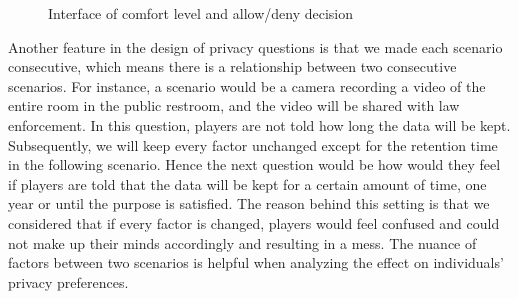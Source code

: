 \documentclass[msc,deptreport,ai]{infthesis}      %
\begin{document}
\begin{figure}[htbp]
\center
{}\hspace{-1pt}%
\hspace{-1pt}%
\caption{Interface of comfort level and allow/deny decision}
\label{fig:select}
\end{figure}

Another feature in the design of privacy questions is that we made each scenario consecutive, which means there is a relationship between two consecutive scenarios. For instance, a scenario would be a camera recording a video of the entire room in the public restroom, and the video will be shared with law enforcement. In this question, players are not told how long the data will be kept. Subsequently, we will keep every factor unchanged except for the retention time in the following scenario. Hence the next question would be how would they feel if players are told that the data will be kept for a certain amount of time, one year or until the purpose is satisfied. The reason behind this setting is that we considered that if every factor is changed, players would feel confused and could not make up their minds accordingly and resulting in a mess. The nuance of factors between two scenarios is helpful when analyzing the effect on individuals' privacy preferences.
\end{document}
